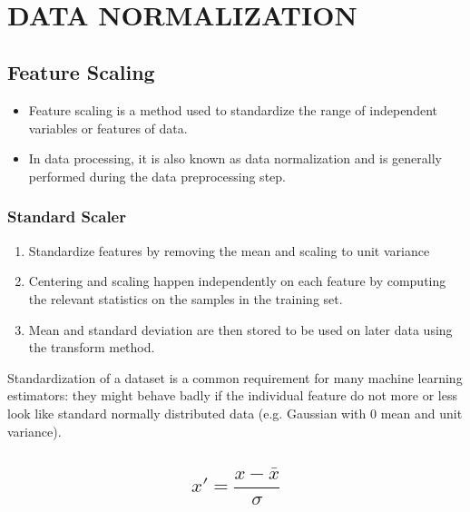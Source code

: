 \documentclass[11pt]{article}
\providecommand{\tightlist}{%
      \setlength{\itemsep}{0pt}\setlength{\parskip}{0pt}}
\begin{document}
    \begin{center}
    \end{center}
    { \hspace*{\fill} \\}
    
    \section{DATA NORMALIZATION}\label{data-normalization}

    \subsection{Feature Scaling}\label{feature-scaling}

\begin{itemize}
\tightlist
\item
  Feature scaling is a method used to standardize the range of
  independent variables or features of data.
\item
  In data processing, it is also known as data normalization and is
  generally performed during the data preprocessing step.
\end{itemize}

    \subsubsection{Standard Scaler}\label{standard-scaler}

\begin{enumerate}
\def\labelenumi{\arabic{enumi}.}
\item
  Standardize features by removing the mean and scaling to unit variance
\item
  Centering and scaling happen independently on each feature by
  computing the relevant statistics on the samples in the training set.
\item
  Mean and standard deviation are then stored to be used on later data
  using the transform method.
\end{enumerate}

Standardization of a dataset is a common requirement for many machine
learning estimators: they might behave badly if the individual feature
do not more or less look like standard normally distributed data (e.g.
Gaussian with 0 mean and unit variance).

\subsection{\texorpdfstring{\[x' = \frac{x - \bar{x}}{\sigma}\]}{x' = \textbackslash{}frac\{x - \textbackslash{}bar\{x\}\}\{\textbackslash{}sigma\}}}\label{x-fracx---barxsigma}
\end{document}
